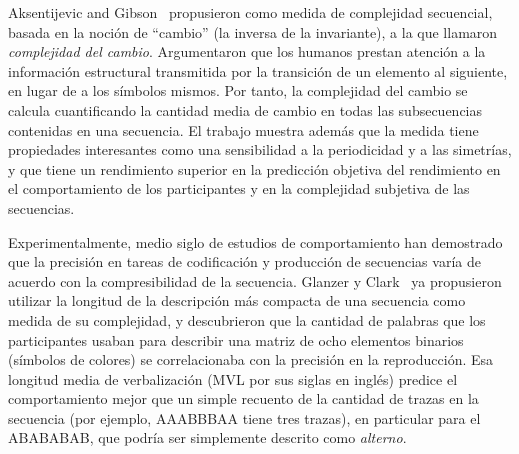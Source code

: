 Aksentijevic and Gibson~\cite{f47} propusieron como medida de complejidad secuencial, basada en la noción de ``cambio'' (la inversa de la invariante), a la que llamaron \textit{complejidad del cambio}. Argumentaron que los humanos prestan atención a la información estructural transmitida por la transición de un elemento al siguiente, en lugar de a los símbolos mismos. Por tanto, la complejidad del cambio se calcula cuantificando la cantidad media de cambio en todas las subsecuencias contenidas en una secuencia. El trabajo muestra además que la medida tiene propiedades interesantes como una sensibilidad a la periodicidad y a las simetrías, y que tiene un rendimiento superior en la predicción objetiva del rendimiento en el comportamiento de los participantes y en la complejidad subjetiva de las secuencias.


Experimentalmente, medio siglo de estudios de comportamiento han demostrado que la precisión en tareas de codificación y producción de secuencias varía de acuerdo con la compresibilidad de la secuencia. Glanzer y Clark~\cite{f35} ya propusieron utilizar la longitud de la descripción más compacta de una secuencia como medida de su complejidad, y descubrieron que la cantidad de palabras que los participantes usaban para describir una matriz de ocho elementos binarios (símbolos de colores) se correlacionaba con la precisión en la reproducción. Esa longitud media de verbalización (MVL por sus siglas en inglés) predice el comportamiento mejor que un simple recuento de la cantidad de trazas en la secuencia (por ejemplo, AAABBBAA tiene tres trazas), en particular para el ABABABAB, que podría ser simplemente descrito como \textit{alterno}.

